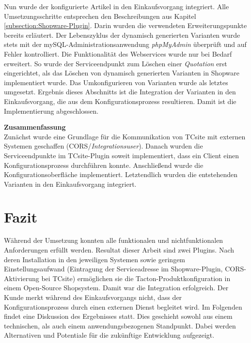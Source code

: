 \documentclass[11pt, a4paper, titlepage, listof=totoc, bibliography=totoc, index=totoc, twoside, openright, headings=normal, draft]{scrreprt}
\begin{document}
Nun wurde der konfigurierte Artikel in den Einkaufsvorgang integriert. Alle  Umsetzungsschritte entsprechen den Beschreibungen aus Kapitel \ref{subsection:Shopware-Plugin}. Darin wurden die verwendeten Erweiterungspunkte bereits erläutert. Der Lebenszyklus der dynamisch generierten Varianten wurde stets mit der mySQL-Administrationsanwendung \emph{phpMyAdmin} überprüft und auf Fehler kontrolliert. Die Funktionalität des Webservices wurde nur bei Bedarf erweitert. So wurde der Serviceendpunkt zum Löschen einer \emph{Quotation} erst eingerichtet, als das Löschen von dynamisch generierten Varianten in Shopware implementiert wurde. Das Umkonfigurieren von Varianten wurde als letztes umgesetzt. Ergebnis dieses Abschnitts ist die Integration der Varianten in den Einkaufsvorgang, die aus dem Konfigurationsprozess resultieren. Damit ist die Implementierung abgeschlossen.

\textbf{Zusammenfassung}\\
Zunächst wurde eine Grundlage für die Kommunikation von TCsite mit externen Systemen geschaffen (CORS/\emph{Integrationsuser}). Danach wurden die Serviceendpunkte im TCsite-Plugin soweit implementiert, dass ein Client einen Konfigurationsprozess durchführen konnte. Anschließend wurde die Konfigurationsoberfläche implementiert. Letztendlich wurden die entstehenden Varianten in den Einkaufsvorgang integriert.

\pagebreak

\section{Fazit}
\label{section:Fazit}
Während der Umsetzung konnten alle funktionalen und nichtfunktionalen Anforderungen erfüllt werden. Resultat dieser Arbeit sind zwei Plugins. Nach deren Installation in den jeweiligen Systemen sowie geringem Einstellungsaufwand (Eintragung der Serviceadresse im Shopware-Plugin, CORS-Aktivierung bei TCsite) ermöglichen sie die Tacton-Produktkonfiguration in einem Open-Source Shopsystem. Damit war die Integration erfolgreich. Der Kunde merkt während des Einkaufsvorgangs nicht, dass der Konfigurationsprozess durch einen externen Dienst begleitet wird. Im Folgenden findet eine Diskussion des Ergebnisses statt. Dies geschieht sowohl aus einem technischen, als auch einem anwendungsbezogenen Standpunkt. Dabei werden Alternativen und Potentiale für die zukünftige Entwicklung aufgezeigt.
\end{document}

